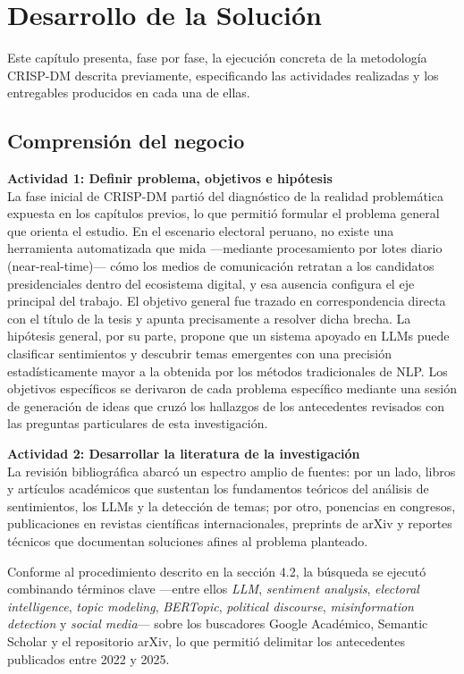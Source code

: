 \chapter{Desarrollo de la Solución}

Este capítulo presenta, fase por fase, la ejecución concreta de la metodología
CRISP-DM descrita previamente, especificando las actividades realizadas y los
entregables producidos en cada una de ellas.

\section{Comprensión del negocio}

\textbf{Actividad 1: Definir problema, objetivos e hipótesis}
\\
La fase inicial de CRISP-DM partió del diagnóstico de la realidad problemática
expuesta en los capítulos previos, lo que permitió formular el problema general que
orienta el estudio. En el escenario electoral peruano, no existe una herramienta
automatizada que mida —mediante procesamiento por lotes diario (near-real-time)— cómo los medios de comunicación retratan a
los candidatos presidenciales dentro del ecosistema digital, y esa ausencia configura
el eje principal del trabajo. El objetivo general fue trazado en correspondencia
directa con el título de la tesis y apunta precisamente a resolver dicha brecha. La
hipótesis general, por su parte, propone que un sistema apoyado en LLMs puede
clasificar sentimientos y descubrir temas emergentes con una precisión
estadísticamente mayor a la obtenida por los métodos tradicionales de NLP. Los
objetivos específicos se derivaron de cada problema específico mediante una sesión
de generación de ideas que cruzó los hallazgos de los antecedentes revisados con
las preguntas particulares de esta investigación.

\textbf{Actividad 2: Desarrollar la literatura de la investigación}
\\
La revisión bibliográfica abarcó un espectro amplio de fuentes: por un lado, libros
y artículos académicos que sustentan los fundamentos teóricos del análisis de
sentimientos, los LLMs y la detección de temas; por otro, ponencias en congresos,
publicaciones en revistas científicas internacionales, preprints de arXiv y reportes
técnicos que documentan soluciones afines al problema planteado.

Conforme al procedimiento descrito en la sección 4.2, la búsqueda se ejecutó
combinando términos clave —entre ellos \textit{LLM}, \textit{sentiment analysis},
\textit{electoral intelligence}, \textit{topic modeling}, \textit{BERTopic},
\textit{political discourse}, \textit{misinformation detection} y
\textit{social media}— sobre los buscadores Google Académico, Semantic Scholar y el
repositorio arXiv, lo que permitió delimitar los antecedentes publicados entre 2022
y 2025.

